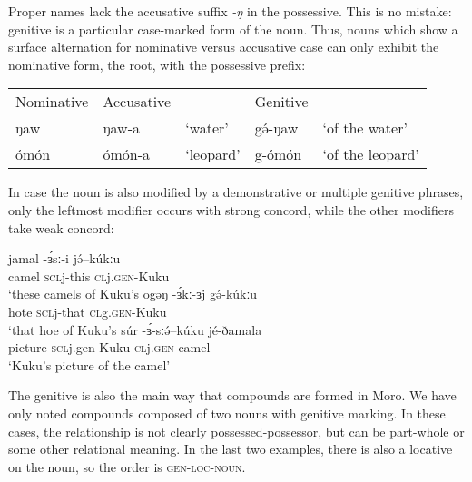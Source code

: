 Proper names lack the accusative suffix \textit{-ŋ} in the  possessive. This is no mistake: genitive is a particular case-marked form of the noun. Thus, nouns which show a surface alternation for nominative versus accusative case can only exhibit the nominative form, the root, with the possessive prefix:

\ea 
\begin{tabular}[t]{lllll}
Nominative & Accusative & & Genitive & \\
ŋaw & ŋaw-a & `water' & gə́-ŋaw & ‘of the water’ \\
ómón & ómón-a & `leopard' &  g-ómón & `of the leopard'
\end{tabular} 
\z

In case the noun is also modified by a demonstrative or multiple genitive phrases, only the leftmost modifier occurs with strong concord, while the other modifiers take weak concord: 

\ea 
	\ea \gll jamal -ɜ́sː-i jə́--kúkːu	\\	
		camel \textsc{scl}j-this \textsc{cl}j.\textsc{gen}-Kuku\\	
		\glt ‘these camels of Kuku’s
	\ex	\gll  ogəŋ -ɜ́kː-ɜj   gə́-kúkːu		\\
			   hote \textsc{scl}j-that \textsc{cl}g.\textsc{gen}-Kuku\\
		\glt 	`that hoe of Kuku’s
	\ex \gll súr -ɜ́-sːə́--kúku jé-ðamala	\\
			picture \textsc{scl}j.gen-Kuku \textsc{cl}j.\textsc{gen}-camel\\
			‘Kuku’s picture of the camel’ 
	\z
\z 



The genitive is also the main way that compounds are formed in Moro. We have only noted compounds composed of two nouns with genitive marking. In these cases, the relationship is not clearly possessed-possessor, but can be part-whole or some other relational meaning. In the last two examples, there is also a locative on the noun, so the order is \textsc{gen}-\textsc{loc}-\textsc{noun}. %

